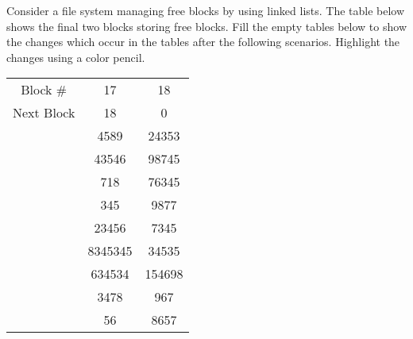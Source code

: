 \documentclass[a4paper,11pt]{exam}
\begin{document}
\printanswers

\begin{center} 
\end{center}

\begin{questions}


 Consider a file system managing free blocks by using linked lists. The table below shows the final two blocks storing free blocks. Fill the empty tables below to show the changes which occur in the tables after the following scenarios. Highlight the changes using a color pencil.


\begin{tabular}{|c|c|c|}
\hline
Block \# & 17 & 18 \\ \cline{1-3}
Next Block & 18 & 0 \\ \cline{1-3}
\multirow{5}{*}{} & 4589 & 24353 \\ \cline{2-3}
	& 43546 & 98745 \\ \cline{2-3}
	& 718 & 76345 \\ \cline{2-3}
	& 345 & 9877 \\ \cline{2-3}
	& 23456 & 7345 \\ \cline{2-3}
	& 8345345 & 34535 \\ \cline{2-3}
	& 634534 & 154698 \\ \cline{2-3}
	& 3478 & 967 \\ \cline{2-3}
	& 56 & 8657 \\ \cline{1-3}
\end{tabular}


\end{questions}
\end{document}
